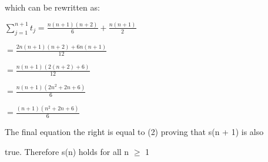 \documentclass[12pt]{article}
\begin{document}
\vspace{5mm} %

which can be rewritten as:\par

\vspace{5mm} %

$\sum_{j=1}^{n + 1} t_{j} = \frac{n(n + 1)(n + 2)}{6} + \frac{n(n + 1)}{2}$\par

\vspace{5mm} %

\hfil $=  \frac{2n(n + 1)(n + 2) + 6n(n + 1)}{12}$\par

\vspace{5mm} %

\hfil $=  \frac{n(n + 1)(2(n + 2) + 6)}{12}$\par

\vspace{5mm} %

\hfil $=  \frac{n(n + 1)(2n^2 + 2n + 6)}{6}$\par

\vspace{5mm} %

\hfil $=  \frac{(n + 1)(n^2 + 2n + 6)}{6}$\par

\vspace{5mm} %

The final equation the right is equal to (2) proving that s(n + 1) is also\par true.
Therefore s(n) holds for all n $\geq$ 1
\end{document}
